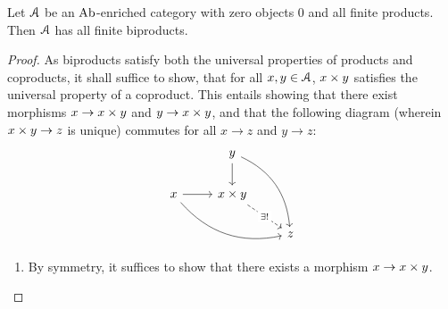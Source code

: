                     \begin{proposition} \label{prop: finite_biproduct_criterion}
                        Let $\mathcal{A}$ be an $\mathrm{Ab}$-enriched category with zero objects $0$ and all finite products. Then $\mathcal{A}$ has all finite biproducts. 
                    \end{proposition}
                        \begin{proof}
                            As biproducts satisfy both the universal properties of products and coproducts, it shall suffice to show, that for all $x, y \in \mathcal{A}$, $x \x y$ satisfies the universal property of a coproduct. This entails showing that there exist morphisms $x \to x \x y$ and $y \to x \x y$, and that the following diagram (wherein $x \x y \to z$ is unique) commutes for all $x \to z$ and $y \to z$:
                                $$
                                    \begin{tikzcd}
                                                                            & y \arrow[rdd, bend left] \arrow[d]                &   \\
                                        x \arrow[rrd, bend right] \arrow[r] & x \x y \arrow[rd, "\exists!" description, dashed] &   \\
                                                                            &                                                   & z
                                    \end{tikzcd}
                                $$
                                \begin{enumerate}
                                    \item By symmetry, it suffices to show that there exists a morphism $x \to x \x y$. 
                                    

\end{enumerate}
\end{proof}
